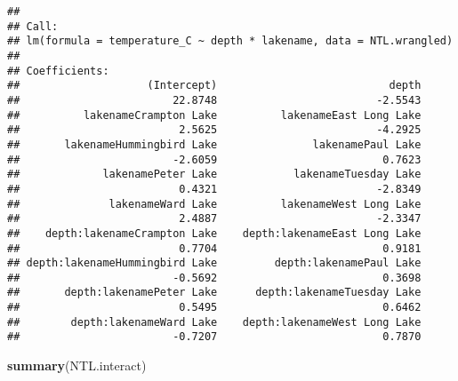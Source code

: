 \documentclass[]{article}
\newenvironment{Shaded}{\begin{snugshade}}{\end{snugshade}}
\newcommand{\KeywordTok}[1]{\textcolor[rgb]{0.13,0.29,0.53}{\textbf{#1}}}
\newcommand{\NormalTok}[1]{#1}
\begin{document}
\begin{verbatim}
## 
## Call:
## lm(formula = temperature_C ~ depth * lakename, data = NTL.wrangled)
## 
## Coefficients:
##                    (Intercept)                           depth  
##                        22.8748                         -2.5543  
##          lakenameCrampton Lake          lakenameEast Long Lake  
##                         2.5625                         -4.2925  
##       lakenameHummingbird Lake               lakenamePaul Lake  
##                        -2.6059                          0.7623  
##             lakenamePeter Lake            lakenameTuesday Lake  
##                         0.4321                         -2.8349  
##              lakenameWard Lake          lakenameWest Long Lake  
##                         2.4887                         -2.3347  
##    depth:lakenameCrampton Lake    depth:lakenameEast Long Lake  
##                         0.7704                          0.9181  
## depth:lakenameHummingbird Lake         depth:lakenamePaul Lake  
##                        -0.5692                          0.3698  
##       depth:lakenamePeter Lake      depth:lakenameTuesday Lake  
##                         0.5495                          0.6462  
##        depth:lakenameWard Lake    depth:lakenameWest Long Lake  
##                        -0.7207                          0.7870
\end{verbatim}

\begin{Shaded}
\begin{Highlighting}[]
\KeywordTok{summary}\NormalTok{(NTL.interact)}
\end{Highlighting}
\end{Shaded}
\end{document}
